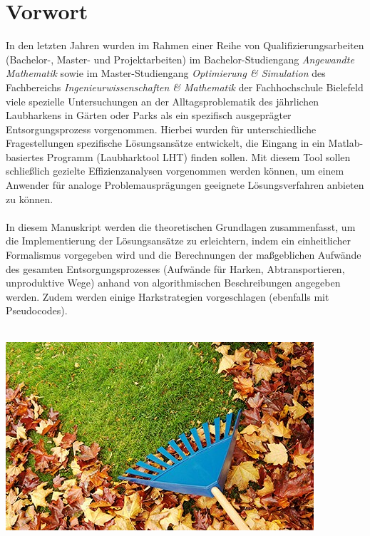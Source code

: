 \chapter*{Vorwort}

In den letzten Jahren wurden im Rahmen einer Reihe von Qualifizierungsarbeiten (Bachelor-, Master- und Projektarbeiten) im Bachelor-Studiengang \textit{Angewandte Mathematik} sowie im Master-Studiengang \textit{Optimierung \& Simulation} des Fachbereichs \textit{Ingenieurwissenschaften \& Mathematik} der Fachhochschule Bielefeld viele spezielle Untersuchungen an der Alltagsproblematik des jährlichen Laubharkens in Gärten oder Parks als ein spezifisch ausgeprägter Entsorgungsprozess vorgenommen. Hierbei wurden für unterschiedliche Fragestellungen spezifische Lösungsansätze entwickelt, die Eingang in ein Matlab-basiertes Programm (\glqq Laubharktool LHT\grqq{}) finden sollen. Mit diesem Tool sollen schließlich gezielte Effizienzanalysen vorgenommen werden können, um einem Anwender für analoge Problemausprägungen geeignete Lösungsverfahren anbieten zu können. \\
\\
In diesem Manuskript werden die theoretischen Grundlagen zusammenfasst, um die Implementierung der Lösungsansätze zu erleichtern, indem ein einheitlicher Formalismus vorgegeben wird und die Berechnungen der maßgeblichen Aufwände des gesamten Entsorgungsprozesses (Aufwände für Harken, Abtransportieren, unproduktive Wege) anhand von algorithmischen Beschreibungen angegeben werden. Zudem werden einige Harkstrategien vorgeschlagen (ebenfalls mit Pseudocodes).
\\ \\

\begin{center}
\begin{minipage}{\textwidth}
\centerline{\includegraphics[angle=0,scale=4.0]{Figures/Laub/Titelfoto.png}}
\label{Titelfoto}
\end{minipage}
\end{center}